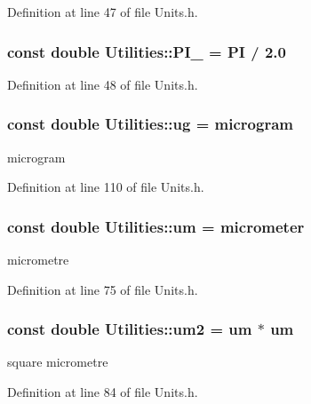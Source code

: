 Definition at line 47 of file Units.h.

\hypertarget{namespace_utilities_a3d5b18587a483b13232097d2ac93341f}{
\subsubsection[{PI\_\-2}]{\setlength{\rightskip}{0pt plus 5cm}const double {\bf Utilities::PI\_} = {\bf PI} / 2.0}}
\label{namespace_utilities_a3d5b18587a483b13232097d2ac93341f}


Definition at line 48 of file Units.h.

\hypertarget{namespace_utilities_ab7041baaaea73a172ddc834aaea10ec1}{
\subsubsection[{ug}]{\setlength{\rightskip}{0pt plus 5cm}const double {\bf Utilities::ug} = {\bf microgram}}}
\label{namespace_utilities_ab7041baaaea73a172ddc834aaea10ec1}


microgram 



Definition at line 110 of file Units.h.

\hypertarget{namespace_utilities_a79bb1876d9d2416239e3ca0b57582018}{
\subsubsection[{um}]{\setlength{\rightskip}{0pt plus 5cm}const double {\bf Utilities::um} = {\bf micrometer}}}
\label{namespace_utilities_a79bb1876d9d2416239e3ca0b57582018}


micrometre 



Definition at line 75 of file Units.h.

\hypertarget{namespace_utilities_a89e97d06d21d5752d28b987caca1164e}{
\subsubsection[{um2}]{\setlength{\rightskip}{0pt plus 5cm}const double {\bf Utilities::um2} = {\bf um} $\ast$ {\bf um}}}
\label{namespace_utilities_a89e97d06d21d5752d28b987caca1164e}


square micrometre 



Definition at line 84 of file Units.h.

